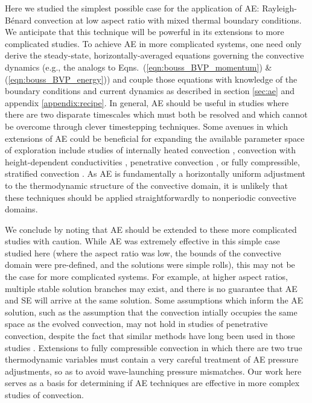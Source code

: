 \documentclass[aps, pre, onecolumn, nofootinbib, notitlepage, groupedaddress, amsfonts, amssymb, amsmath, longbibliography]{revtex4-1}
\newcommand{\RB}{Rayleigh-B\'{e}nard }
\begin{document}
Here we studied the simplest possible case for the application of AE:
\RB convection at low aspect ratio with mixed thermal boundary conditions. 
We anticipate that
this technique will be powerful in its extensions to more complicated studies.
To achieve AE in more complicated systems, one need only derive 
the steady-state, horizontally-averaged equations governing
the convective dynamics
(e.g., the analogs to Eqns.~(\ref{eqn:bouss_BVP_momentum}) \& (\ref{eqn:bouss_BVP_energy}))
and couple those equations with knowledge of the boundary conditions
and current dynamics as described in
section \ref{sec:ae} and appendix \ref{appendix:recipe}.
In general, AE should be useful in studies where there are two disparate
timescales which must both be resolved and which cannot be overcome through
clever timestepping techniques.  Some avenues in which extensions of AE could
be beneficial for expanding the available parameter space of exploration
include studies of internally heated convection \cite{goluskin2016},
convection with height-dependent conductivities \cite{kapyla&all2017},
penetrative convection \cite{hurlburt&all1986,brandenburg&all2005,couston&all2017},
or fully compressible, stratified convection \cite{anders&brown2017}.
As AE is fundamentally a horizontally uniform adjustment to the thermodynamic
structure of the convective domain, it is unlikely that these techniques
should be applied straightforwardly to nonperiodic convective domains.

We conclude by noting that AE should be extended to these more complicated
studies with caution. 
While AE was extremely effective in this simple case studied here
(where the aspect ratio was low, 
the bounds of the convective domain were pre-defined,
and the solutions were simple rolls),
this may not be the case for more complicated systems. For example, at
higher aspect ratios, multiple stable solution branches 
may exist, and there is no guarantee that AE and SE will
arrive at the same solution. 
Some assumptions which inform the AE solution, such as the assumption
that the convection
intially occupies the same space as the evolved convection, may not hold in
studies of penetrative convection, despite the fact that similar methods have
long been used in those studies \cite{hurlburt&all1986}. Extensions to 
fully compressible convection in which there are two true thermodynamic
variables \cite{anders&brown2017} must contain a very careful treatment of
AE pressure adjustments, so as to avoid wave-launching pressure mismatches.
Our work here serves as a basis for determining if AE techniques are
effective in more complex studies of convection.
\end{document}
